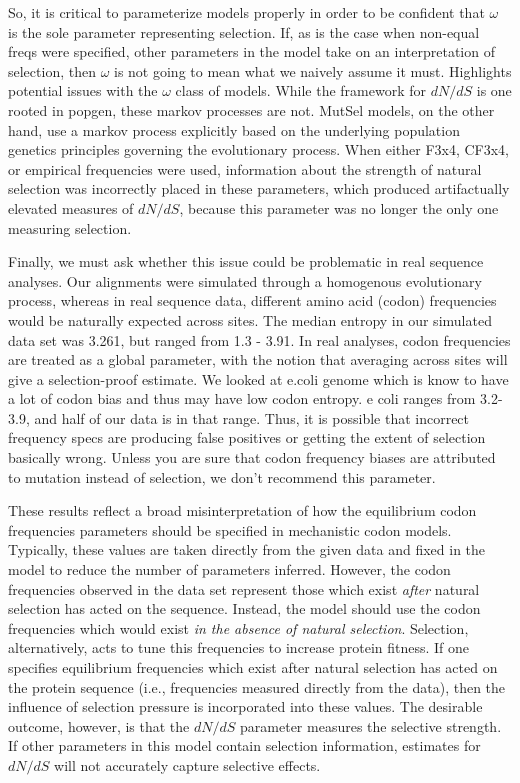 \documentclass[11pt]{article}
\begin{document}
So, it is critical to parameterize models properly in order to be confident that $\omega$ is the sole parameter representing selection. If, as is the case when non-equal freqs were specified, other parameters in the model take on an interpretation of selection, then $\omega$ is not going to mean what we naively assume it must.
Highlights potential issues with the $\omega$ class of models. While the framework for $dN/dS$ is one rooted in popgen, these markov processes are not. MutSel models, on the other hand, use a markov process explicitly based on the underlying population genetics principles governing the evolutionary process. When either F3x4, CF3x4, or empirical frequencies were used, information about the strength of natural selection was incorrectly placed in these parameters, which produced artifactually elevated measures of $dN/dS$, because this parameter was no longer the only one measuring selection.



Finally, we must ask whether this issue could be problematic in real sequence analyses. Our alignments were simulated through a homogenous evolutionary process, whereas in real sequence data, different amino acid (codon) frequencies would be naturally expected across sites. The median entropy in our simulated data set was 3.261, but ranged from 1.3 - 3.91. In real analyses, codon frequencies are treated as a global parameter, with the notion that averaging across sites will give a selection-proof estimate. We looked at e.coli genome which is know to have a lot of codon bias and thus may have low codon entropy. e coli ranges from 3.2-3.9, and half of our data is in that range. Thus, it is possible that incorrect frequency specs are producing false positives or getting the extent of selection basically wrong. Unless you are sure that codon frequency biases are attributed to mutation instead of selection, we don't recommend this parameter.


These results reflect a broad misinterpretation of how the equilibrium codon frequencies parameters should be specified in mechanistic codon models. Typically, these values are taken directly from the given data and fixed in the model to reduce the number of parameters inferred. However, the codon frequencies observed in the data set represent those which exist \textit{after} natural selection has acted on the sequence. Instead, the model should use the codon frequencies which would exist \textit{in the absence of natural selection}. Selection, alternatively, acts to tune this frequencies to increase protein fitness. If one specifies equilibrium frequencies which exist after natural selection has acted on the protein sequence (i.e., frequencies measured directly from the data), then the influence of selection pressure is incorporated into these values. The desirable outcome, however, is that the $dN/dS$ parameter measures the selective strength. If other parameters in this model contain selection information, estimates for $dN/dS$ will not accurately capture selective effects.
\end{document}
